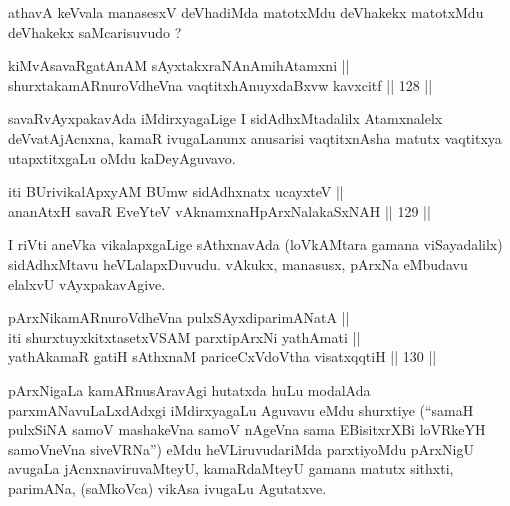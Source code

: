 \begin{artha}
athavA keVvala manasesxV deVhadiMda matotxMdu deVhakekx
matotxMdu deVhakekx saMcarisuvudo ?
\end{artha}


\begin{shl}
kiMvA\footnotemark[5] savaRgatAnAM sAyxtakxraNAnAmihA\s \s tamxni || \\
shurxtakamARnuroVdheVna vaqtitxhAnuyxdaBxvw kavxcitf \hfill || 128 ||  
\end{shl}

\begin{artha}
savaRvAyxpakavAda iMdirxyagaLige I sidAdhxMtadalilx
Atamxnalelx deVvatAjAcnxna, kamaR ivugaLanunx anusarisi vaqtitxnAsha
matutx vaqtitxya utapxtitxgaLu oMdu kaDeyAguvavo.
\end{artha}


\begin{shl}
iti BUrivikalApxyAM BUmw sidAdhxnatx ucayxteV || \\
ananAtxH savaR EveYteV vAknamxnaHpArxNalakaSxNAH \hfill || 129 ||  
\end{shl}

\begin{artha}
I riVti aneVka vikalapxgaLige sAthxnavAda (loVkAMtara gamana
viSayadalilx) sidAdhxMtavu heVLalapxDuvudu. vAkukx, manasusx, pArxNa
eMbudavu elalxvU vAyxpakavAgive.
\end{artha}

\begin{shl}
pArxNikamARnuroVdheVna pulxSAyxdiparimANatA || \\
iti shurxtuyxkitxtasetxVSAM parxtipArxNi yathAmati || \\
yathAkamaR gatiH sAthxnaM pariceCxVdoV\s tha visatxqqtiH \hfill || 130 ||  
\end{shl}

\begin{artha}
pArxNigaLa kamARnusAravAgi hutatxda huLu modalAda parxmANavuLaLxdAdxgi
iMdirxyagaLu Aguvavu eMdu shurxtiye (``samaH pulxSiNA samoV mashakeVna samoV nAgeVna sama EBisitxrXBi loVRkeYH samoV\s neVna siveVRNa'') eMdu heVLiruvudariMda parxtiyoMdu pArxNigU avugaLa jAcnxnaviruvaMteyU, kamaRdaMteyU gamana
matutx sithxti, parimANa, (saMkoVca) vikAsa ivugaLu Agutatxve.
\end{artha}

